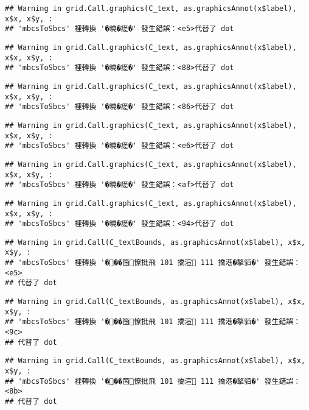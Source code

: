\documentclass[
]{article}
\begin{document}
\begin{verbatim}
## Warning in grid.Call.graphics(C_text, as.graphicsAnnot(x$label), x$x, x$y, :
## 'mbcsToSbcs' 裡轉換 '�曉�瘥�' 發生錯誤：<e5>代替了 dot
\end{verbatim}

\begin{verbatim}
## Warning in grid.Call.graphics(C_text, as.graphicsAnnot(x$label), x$x, x$y, :
## 'mbcsToSbcs' 裡轉換 '�曉�瘥�' 發生錯誤：<88>代替了 dot
\end{verbatim}

\begin{verbatim}
## Warning in grid.Call.graphics(C_text, as.graphicsAnnot(x$label), x$x, x$y, :
## 'mbcsToSbcs' 裡轉換 '�曉�瘥�' 發生錯誤：<86>代替了 dot
\end{verbatim}

\begin{verbatim}
## Warning in grid.Call.graphics(C_text, as.graphicsAnnot(x$label), x$x, x$y, :
## 'mbcsToSbcs' 裡轉換 '�曉�瘥�' 發生錯誤：<e6>代替了 dot
\end{verbatim}

\begin{verbatim}
## Warning in grid.Call.graphics(C_text, as.graphicsAnnot(x$label), x$x, x$y, :
## 'mbcsToSbcs' 裡轉換 '�曉�瘥�' 發生錯誤：<af>代替了 dot
\end{verbatim}

\begin{verbatim}
## Warning in grid.Call.graphics(C_text, as.graphicsAnnot(x$label), x$x, x$y, :
## 'mbcsToSbcs' 裡轉換 '�曉�瘥�' 發生錯誤：<94>代替了 dot
\end{verbatim}

\begin{verbatim}
## Warning in grid.Call(C_textBounds, as.graphicsAnnot(x$label), x$x, x$y, :
## 'mbcsToSbcs' 裡轉換 '���箇憭批飛 101 撟渲 111 撟港�摮貊�' 發生錯誤：<e5>
## 代替了 dot
\end{verbatim}

\begin{verbatim}
## Warning in grid.Call(C_textBounds, as.graphicsAnnot(x$label), x$x, x$y, :
## 'mbcsToSbcs' 裡轉換 '���箇憭批飛 101 撟渲 111 撟港�摮貊�' 發生錯誤：<9c>
## 代替了 dot
\end{verbatim}

\begin{verbatim}
## Warning in grid.Call(C_textBounds, as.graphicsAnnot(x$label), x$x, x$y, :
## 'mbcsToSbcs' 裡轉換 '���箇憭批飛 101 撟渲 111 撟港�摮貊�' 發生錯誤：<8b>
## 代替了 dot
\end{verbatim}
\end{document}
